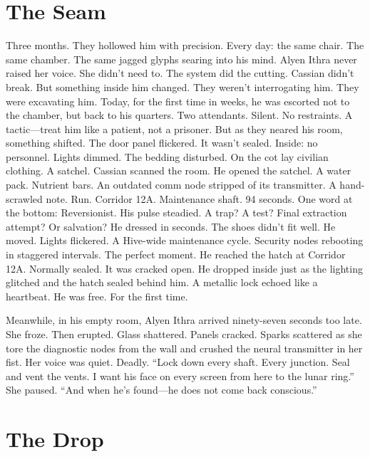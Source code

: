\documentclass[12pt,oneside]{book}
\begin{document}
\chapter{The Seam}

Three months.
They hollowed him with precision.
Every day: the same chair. The same chamber. The same jagged glyphs searing into his mind. Alyen Ithra never raised her voice. She didn’t need to. The system did the cutting.
Cassian didn’t break.
But something inside him changed.
They weren’t interrogating him.
They were excavating him.
Today, for the first time in weeks, he was escorted not to the chamber, but back to his quarters.
Two attendants. Silent. No restraints.
A tactic—treat him like a patient, not a prisoner.
But as they neared his room, something shifted.
The door panel flickered.
It wasn’t sealed.
Inside: no personnel. Lights dimmed. The bedding disturbed.
On the cot lay civilian clothing. A satchel.
Cassian scanned the room.
He opened the satchel.
A water pack. Nutrient bars. An outdated comm node stripped of its transmitter. A hand-scrawled note.
Run.
 Corridor 12A.
 Maintenance shaft.
 94 seconds.
One word at the bottom:
Reversionist.
His pulse steadied.
A trap? A test? Final extraction attempt?
Or salvation?
He dressed in seconds. The shoes didn’t fit well.
He moved.
Lights flickered. A Hive-wide maintenance cycle. Security nodes rebooting in staggered intervals.
The perfect moment.
He reached the hatch at Corridor 12A. Normally sealed.
It was cracked open.
He dropped inside just as the lighting glitched and the hatch sealed behind him.
A metallic lock echoed like a heartbeat.
He was free.
For the first time.

Meanwhile, in his empty room, Alyen Ithra arrived ninety-seven seconds too late.
She froze.
Then erupted.
Glass shattered. Panels cracked. Sparks scattered as she tore the diagnostic nodes from the wall and crushed the neural transmitter in her fist.
Her voice was quiet. Deadly.
“Lock down every shaft. Every junction. Seal and vent the vents. I want his face on every screen from here to the lunar ring.”
She paused.
“And when he’s found—he does not come back conscious.”



\chapter{The Drop}
\end{document}

